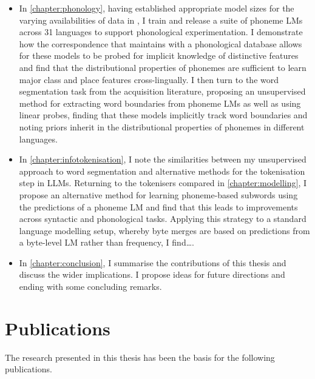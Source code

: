 \begin{itemize}
    \item In \cref{chapter:phonology}, having established appropriate model sizes for the varying availabilities of data in \ipachildes, I train and release a suite of phoneme LMs across 31 languages to support phonological experimentation. I demonstrate how the correspondence that \gpp maintains with a phonological database allows for these models to be probed for implicit knowledge of distinctive features and find that the distributional properties of phonemes are sufficient to learn major class and place features cross-lingually. I then turn to the word segmentation task from the acquisition literature, proposing an unsupervised method for extracting word boundaries from phoneme LMs as well as using linear probes, finding that these models implicitly track word boundaries and noting priors inherit in the distributional properties of phonemes in different languages.
    \item In \cref{chapter:infotokenisation}, I note the similarities between my unsupervised approach to word segmentation and alternative methods for the tokenisation step in LLMs. Returning to the tokenisers compared in \cref{chapter:modelling}, I propose an alternative method for learning phoneme-based subwords using the predictions of a phoneme LM and find that this leads to improvements across syntactic and phonological tasks. Applying this strategy to a standard language modelling setup, whereby byte merges are based on predictions from a byte-level LM rather than frequency, I find\ldots {}. 
    \item In \cref{chapter:conclusion}, I summarise the contributions of this thesis and discuss the wider implications. I propose ideas for future directions and ending with some concluding remarks.
\end{itemize}

\section{Publications}

The research presented in this thesis has been the basis for the following publications.

